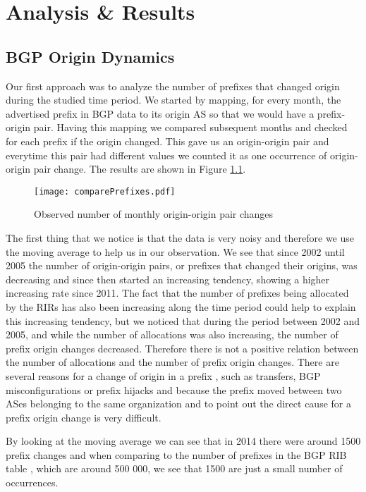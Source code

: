\documentclass[11pt,a4paper]{scrreprt}
\begin{document}
\chapter{Analysis \& Results}


\section{BGP Origin Dynamics}

Our first approach was to analyze the number of prefixes that changed origin during the studied time period. We started by mapping, for every month, the advertised prefix in BGP data to its origin AS so that we would have a prefix-origin pair. Having this mapping we compared subsequent months and checked for each prefix if the origin changed. This gave us an origin-origin pair and everytime this pair had different values we counted it as one occurrence of origin-origin pair change. The results are shown in Figure \ref{fig:comparePrefixes}.

\begin{figure}[!h]
\centering
\texttt{[image: comparePrefixes.pdf]}
\caption{Observed number of monthly
origin-origin pair changes}
\label{fig:comparePrefixes}
\end{figure}

The first thing that we notice is that the data is very noisy and therefore we use the moving average to help us in our observation. We see that since 2002 until 2005 the number of origin-origin pairs, or prefixes that changed their origins, was decreasing and since then started an increasing tendency, showing a higher increasing rate since 2011. The fact that the number of prefixes being allocated by the RIRs has also been increasing along the time period could help to explain this increasing tendency, but we noticed that during the period between 2002 and 2005, and while the number of allocations was also increasing, the number of prefix origin changes decreased. Therefore there is not a positive relation between the number of allocations and the number of prefix origin changes. There are several reasons for a change of origin in a prefix \cite{IPv4_Transfer_Markets}, such as transfers, BGP misconfigurations or prefix hijacks and because the prefix moved between two ASes belonging to the same organization and to point out the direct cause for a prefix origin change is very difficult.      

By looking at the moving average we can see that in 2014 there were around 1500 prefix changes and when comparing to the number of prefixes in the BGP RIB table \cite{Potaroo}, which are around 500 000, we see that 1500 are just a small number of occurrences.
\end{document}
